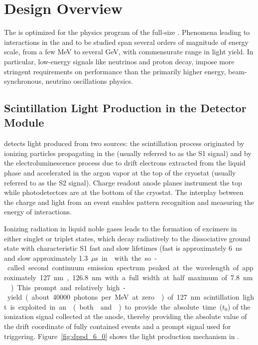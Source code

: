 \section{Design Overview}
\label{sec:dp-pds-overview}

The \dual {} is optimized for the physics program of the full-size \dune {}. Phenomena leading to interactions in the   and to be studied span several orders of magnitude of energy scale, from a few \si{MeV} to several \si{GeV}, with commensurate range in light yield. In particular, low-energy signals like  neutrinos and proton decay, impose more stringent requirements on  performance than the primarily higher energy, beam-synchronous, neutrino oscillations physics.



\subsection{Scintillation Light Production in the \dual Detector Module}
\label{sec:dp-pds-overview_scintillation}

\dual {} detects light produced from two sources: the scintillation process originated by ionizing particles propagating in the  (usually referred to as the S1 signal) and by the electroluminescence process due to drift electrons extracted from the liquid phase and accelerated in the argon vapor at the top of the cryostat (usually referred to as the S2 signal). Charge readout anode planes instrument the top while photodetectors are at the bottom of the cryostat. The interplay between the charge and light from an event enables pattern recognition and measuring the energy of interactions.

Ionizing radiation in liquid noble gases leads to the formation of excimers in either singlet or triplet states, which decay radiatively to the dissociative ground state with characteristic S1 fast and slow lifetimes (fast is approximately \SI{6}{ns} and slow approximately \SI{1.3}{$\mu$s} in \lar with the so-called second continuum emission spectrum peaked at the wavelength of approximately \SI{127}{nm}, \SI{126.8}{nm} with a full width at half maximum of \SI{7.8}{nm} \cite{Heindl}). This prompt and relatively high-yield (about \num{40000} photons per \si{MeV} at zero \efield) of \SI{127}{nm} scintillation light is exploited in an  (both  and ) to provide the absolute time ($t_0$) of the ionization signal collected at the anode, thereby providing the absolute value of the drift coordinate of fully contained events and a prompt signal used for triggering. Figure~\ref{fig:dppd_6_0} shows the light production mechanism in \lar.

